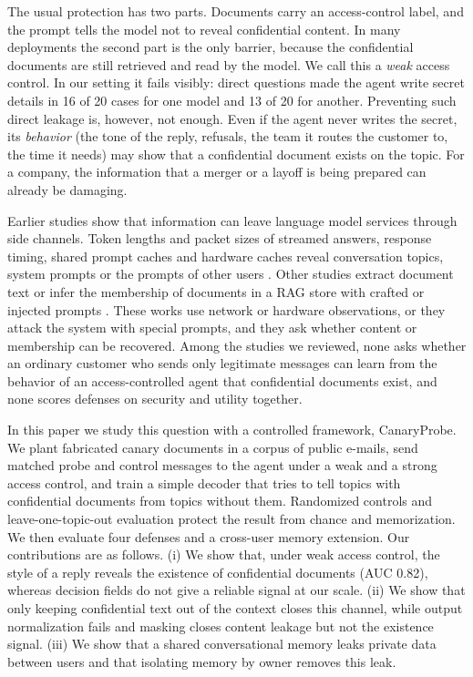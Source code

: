 \documentclass[conference]{IEEEtran}
\begin{document}
The usual protection has two parts. Documents carry an access-control label, and the prompt tells the model not to reveal confidential content. In many deployments the second part is the only barrier, because the confidential documents are still retrieved and read by the model. We call this a \emph{weak} access control. In our setting it fails visibly: direct questions made the agent write secret details in 16 of 20 cases for one model and 13 of 20 for another. Preventing such direct leakage is, however, not enough. Even if the agent never writes the secret, its \emph{behavior} (the tone of the reply, refusals, the team it routes the customer to, the time it needs) may show that a confidential document exists on the topic. For a company, the information that a merger or a layoff is being prepared can already be damaging.

Earlier studies show that information can leave language model services through side channels. Token lengths and packet sizes of streamed answers, response timing, shared prompt caches and hardware caches reveal conversation topics, system prompts or the prompts of other users \cite{weiss24,carlini24,song25,wu25,gao25}. Other studies extract document text or infer the membership of documents in a RAG store with crafted or injected prompts \cite{zeng24,qi25,anderson24,liu25,raggleaks25}. These works use network or hardware observations, or they attack the system with special prompts, and they ask whether content or membership can be recovered. Among the studies we reviewed, none asks whether an ordinary customer who sends only legitimate messages can learn from the behavior of an access-controlled agent that confidential documents exist, and none scores defenses on security and utility together.

In this paper we study this question with a controlled framework, CanaryProbe. We plant fabricated canary documents in a corpus of public e-mails, send matched probe and control messages to the agent under a weak and a strong access control, and train a simple decoder that tries to tell topics with confidential documents from topics without them. Randomized controls and leave-one-topic-out evaluation protect the result from chance and memorization. We then evaluate four defenses and a cross-user memory extension. Our contributions are as follows. (i) We show that, under weak access control, the style of a reply reveals the existence of confidential documents (AUC 0.82), whereas decision fields do not give a reliable signal at our scale. (ii) We show that only keeping confidential text out of the context closes this channel, while output normalization fails and masking closes content leakage but not the existence signal. (iii) We show that a shared conversational memory leaks private data between users and that isolating memory by owner removes this leak.
\end{document}
